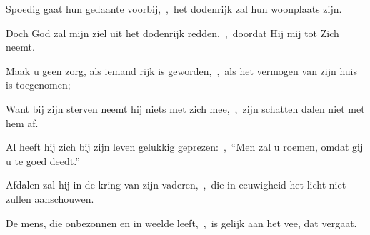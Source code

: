 \documentclass[12pt,twoside,a5paper]{article}
\begin{document}
\begin{halfparskip}
  Spoedig gaat hun gedaante voorbij,~\sep\ het dodenrijk zal hun woonplaats zijn.

  Doch God zal mijn ziel uit het dodenrijk redden,~\sep\ doordat Hij mij tot Zich neemt.

  Maak u geen zorg, als iemand rijk is geworden,~\sep\ als het vermogen van zijn huis is toegenomen;

  Want bij zijn sterven neemt hij niets met zich mee,~\sep\ zijn schatten dalen niet met hem af.

  Al heeft hij zich bij zijn leven gelukkig geprezen:~\sep\ ``Men zal u roemen, omdat gij u te goed deedt.''

  Afdalen zal hij in de kring van zijn vaderen,~\sep\ die in eeuwigheid het licht niet zullen aanschouwen.

  De mens, die onbezonnen en in weelde leeft,~\sep\ is gelijk aan het vee, dat vergaat.
\end{halfparskip}

\end{document}

